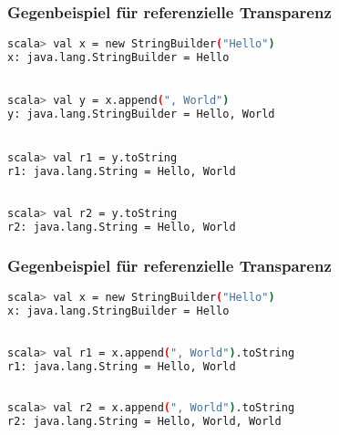 	\section*{}
	\begin{frame}[fragile]
		\frametitle{Gegenbeispiel für referenzielle Transparenz}
		\begin{lstlisting}[language=bash]
scala> val x = new StringBuilder("Hello")
x: java.lang.StringBuilder = Hello 

	
scala> val y = x.append(", World") 
y: java.lang.StringBuilder = Hello, World 


scala> val r1 = y.toString 
r1: java.lang.String = Hello, World 

		
scala> val r2 = y.toString 
r2: java.lang.String = Hello, World 
\end{lstlisting}	
\end{frame}
	\begin{frame}[fragile]
		\frametitle{Gegenbeispiel für referenzielle Transparenz}
		\begin{lstlisting}[language=bash]
scala> val x = new StringBuilder("Hello")
x: java.lang.StringBuilder = Hello 

		
scala> val r1 = x.append(", World").toString 
r1: java.lang.String = Hello, World
 
		
scala> val r2 = x.append(", World").toString 
r2: java.lang.String = Hello, World, World 
\end{lstlisting}	
\end{frame}